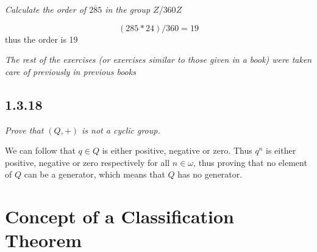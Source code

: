 \documentclass[11pt,oneside,titlepage]{book}
\begin{document}
\textit{Calculate the order of $\overline{285}$ in the group $Z/360Z$}

$$(285 * 24) / 360 = 19$$
thus the order is 19


\textit{The rest of the exercises (or exercises similar to those given in a book) were
  taken care of previously in previous books}

\subsection*{1.3.18}

\textit{Prove that $(Q, +)$ is not a cyclic group.}

We can follow that $q \in Q$ is either positive, negative or zero. Thus $q^n$ is either positive,
negative or zero respectively for all $n \in \omega$, thus proving that no element of $Q$ can be
a generator, which means that $Q$ has no generator.



\section{Concept of a Classification Theorem}
\end{document}
